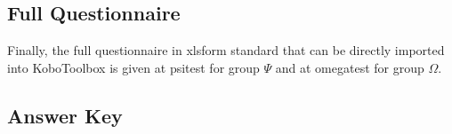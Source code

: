 \subsection{Full Questionnaire}\label{app:questionnaire}
Finally, the full questionnaire in \gls{xlsform} standard that can be directly imported into KoboToolbox is given at \gls{psitest} for group $\Psi$ and at \gls{omegatest} for group $\Omega$.

\subsection{Answer Key}\label{app:answer}

